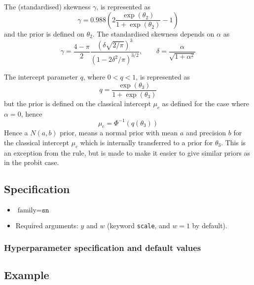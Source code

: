 \documentclass[a4paper,11pt]{article}
\begin{document}
The (standardised) skewness $\gamma$, is represented as
\begin{displaymath}
    \gamma=0.988 (2\frac{\exp(\theta_2)}{1+\exp(\theta_2)}-1)
\end{displaymath}
and the prior is defined on $\theta_{2}$. The standardised skewness
depends on $\alpha$ as
\begin{displaymath}
\gamma ={\frac  {4-\pi }{2}}{\frac{\left(\delta {\sqrt  {2/\pi
              }}\right)^{3}}{\left(1-2\delta^{2}/\pi
        \right)^{{3/2}}}}, \qquad
    \delta ={\frac{\alpha}{{\sqrt{1+\alpha^{2}}}}}
\end{displaymath}

The intercept parameter $q$, where $0<q<1$, is represented as
\begin{displaymath}
    q=\frac{\exp(\theta_3)}{1+\exp(\theta_3)}
\end{displaymath}
but the prior is defined on the classical intercept $\mu_c$ as defined
for the case where $\alpha=0$, hence
\begin{displaymath}
    \mu_c =  \Phi^{-1}(q(\theta_3))
\end{displaymath}
Hence a $N(a,b)$ prior, means a normal prior with mean $a$ and
precision $b$ for the classical intercept $\mu_c$ which is internally
transferred to a prior for $\theta_3$. This is an exception from the
rule, but is made to make it easier to give similar priors as in the
probit case.


\subsection*{Specification}

\begin{itemize}
\item $\text{family}=\texttt{sn}$
\item Required arguments: $y$ and $w$ (keyword \texttt{scale}, and 
    $w=1$ by default).
\end{itemize}

\subsubsection*{Hyperparameter specification and default values}



\subsection*{Example}
\end{document}
